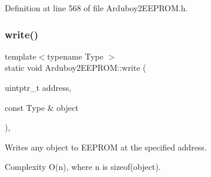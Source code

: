 Definition at line 568 of file Arduboy2\+E\+E\+P\+R\+O\+M.\+h.

\mbox{\label{classArduboy2EEPROM_abf7be1f27f4815de59257210dac8c9eb}} 
\subsubsection{\texorpdfstring{write()}{write()}}
{\footnotesize\ttfamily template$<$typename Type $>$ \\
static void Arduboy2\+E\+E\+P\+R\+O\+M\+::write (\begin{DoxyParamCaption}\item[{uintptr\+\_\+t}]{address,  }\item[{const Type \&}]{object }\end{DoxyParamCaption})\hspace{0.3cm}{\ttfamily [inline]}, {\ttfamily [static]}}



Writes any object to E\+E\+P\+R\+OM at the specified address. 

\begin{DoxyParagraph}{Complexity}
{\ttfamily O(n)}, where {\ttfamily n} is {\ttfamily sizeof(object)}.
\end{DoxyParagraph}

